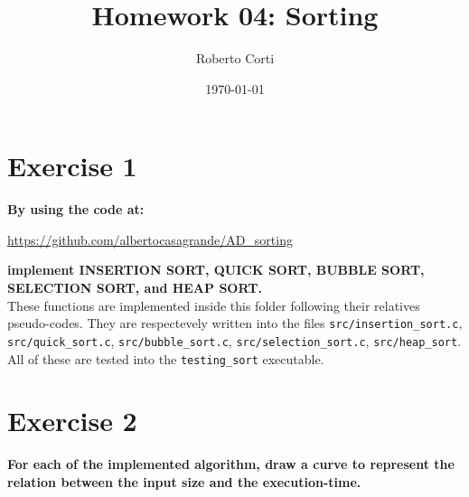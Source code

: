 \documentclass{article}
\title{Homework 04: Sorting}
\date{\today}
\author{Roberto Corti}
\begin{document}
	\maketitle
	\section*{Exercise 1}
	\textbf{By using the code at:}
		\begin{center}
			\url{https://github.com/albertocasagrande/AD_sorting}
		\end{center}
	\textbf{implement INSERTION SORT, QUICK SORT, BUBBLE SORT, SELECTION SORT, and HEAP SORT.} \\
	
	\noindent These functions are implemented inside this folder following their relatives pseudo-codes. They are respectevely written into the files \texttt{src/insertion\_sort.c}, \texttt{src/quick\_sort.c}, \texttt{src/bubble\_sort.c}, \texttt{src/selection\_sort.c}, \texttt{src/heap\_sort}. All of these are tested into the  \texttt{testing\_sort} executable.
	
	\section*{Exercise 2}
	\textbf{For each of the implemented algorithm, draw a curve to represent the relation between the input size and the execution-time.}
	
\end{document}
